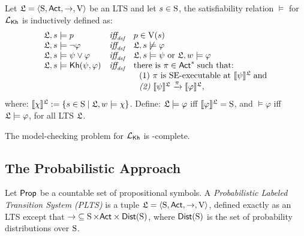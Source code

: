 \begin{definition} \label{def:semantics-kh}
    Let $\model = \tup{\S,\ACT,\ra,\V}$ be an LTS and let $s\in\S$, the satisfiability relation $\models$ for $\Khlogic$ is inductively defined as:
    \[
    \begin{array}{l@{\ \ \ }c@{\ \ \  }l}
    \model, s \models p & \iffdef & p \in \V(s) \\
    \model, s\models \neg\varphi & \iffdef & \model, s \not\models \varphi \\
    \model, s \models \psi\vee\varphi & \iffdef & \model, s \models \psi \mbox{ or }\model, w \models \varphi \\
    \model, s \models \kh(\psi,\varphi) & \iffdef & \text{there is } \plan \in \ACT^* \;\text{such that:} \\
    & & \ \ \text{\rm (1)} \ \plan \text{ is SE-executable at }  \truthset{\model}{\psi}\; \text{and} \\
    & & \ \ \text{\em (2)} \ \truthset{\model}{\psi} \reach{\plan} \truthset{\model}{\varphi}, 
    \end{array}
    \]      where: $\truthset{\model}{\chi} := \csetsc{s\in\S}{\model,w\models\chi}$. Define: $\model\models\varphi$ iff  $\truthset{\model}{\varphi}=\S$, and $\models\varphi$ iff $\model\models\varphi$, for all LTS $\model$.
\end{definition}

\begin{proposition}
    The model-checking problem for $\Khlogic$ is \PSPACE-complete.
\end{proposition}

\subsection{The Probabilistic Approach}

\begin{definition}\label{def:plts}
    Let $\PROP$ be a countable set of propositional symbols. 
    A \emph{Probabilistic Labeled Transition System (PLTS)}  is a tuple
    $\model=\tup{\S,\ACT,\ra,\V}$, defined exactly as an LTS except that ${\ra}\subseteq \S \times \ACT \times \dist(\S)$, where  $\dist(\S)$ is the set of probability distributions over $\S$.
\end{definition}

